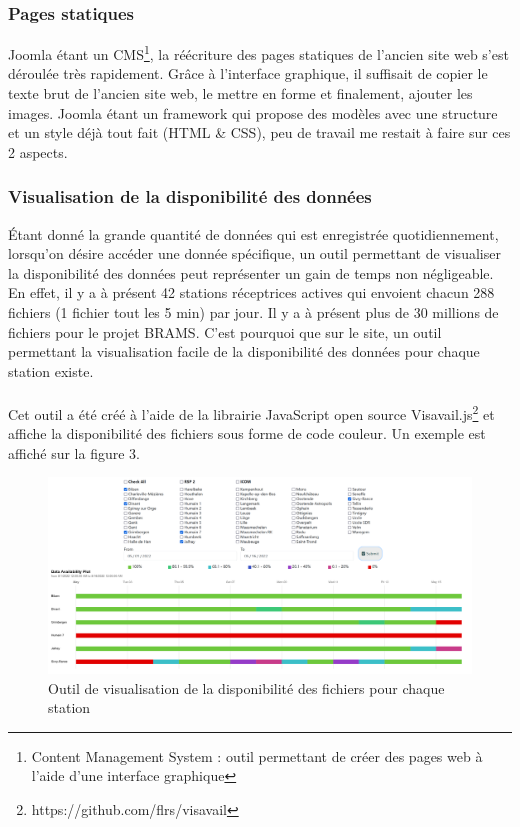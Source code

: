 \documentclass[11pt]{article}
\begin{document}
\subsubsection{Pages statiques}
Joomla étant un CMS\footnote{Content Management System : outil permettant de créer des pages web à l'aide d'une interface graphique}, la réécriture des pages statiques de l'ancien site web s'est déroulée très rapidement.
Grâce à l'interface graphique, il suffisait de copier le texte brut de l'ancien site web, le mettre en forme et finalement, ajouter les images.
Joomla étant un framework qui propose des modèles avec une structure et un style déjà tout fait (HTML \& CSS), peu de travail me restait à faire sur ces 2 aspects.

\subsubsection{Visualisation de la disponibilité des données}
Étant donné la grande quantité de données qui est enregistrée quotidiennement, lorsqu'on désire accéder une donnée spécifique, un outil permettant de visualiser la disponibilité des données peut représenter un gain de temps non négligeable.
En effet, il y a à présent 42 stations réceptrices actives qui envoient chacun 288 fichiers (1 fichier tout les 5 min) par jour.
Il y a à présent plus de 30 millions de fichiers pour le projet BRAMS.
C'est pourquoi que sur le site, un outil permettant la visualisation facile de la disponibilité des données pour chaque station existe.\\
\\
Cet outil a été créé à l'aide de la librairie JavaScript open source Visavail.js\footnote{https://github.com/flrs/visavail} et affiche la disponibilité des fichiers sous forme de code couleur.
Un exemple est affiché sur la figure 3.

\begin{figure}[t]
    \begin{center}
        \includegraphics[scale=0.155]{availability.png}
        \caption{Outil de visualisation de la disponibilité des fichiers pour chaque station}
    \end{center}
\end{figure}
\end{document}
